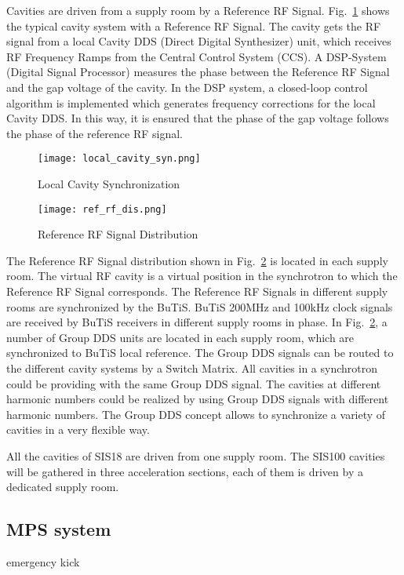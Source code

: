 Cavities are driven from a supply room by a Reference RF Signal. Fig.~\ref{local_cavity_syn} shows the typical cavity system with a Reference RF Signal. The cavity gets the RF signal from a local Cavity DDS (Direct Digital Synthesizer) unit, which receives RF Frequency Ramps from the Central Control System (\gls{CCS}). A \gls{DSP}-System (Digital Signal Processor) measures the phase between the Reference RF Signal and the gap voltage of the cavity. In the DSP system, a closed-loop control algorithm is implemented which generates frequency corrections for the local Cavity DDS. In this way, it is ensured that the phase of the gap voltage follows the phase of the reference RF signal. 
\begin{figure}[!htb]
   \centering   
   \texttt{[image: local\_cavity\_syn.png]}
   \caption{Local Cavity Synchronization}
   \label{local_cavity_syn}
\end{figure}
\begin{figure}[!htb]
   \centering   
   \texttt{[image: ref\_rf\_dis.png]}
   \caption{Reference RF Signal Distribution}
   \label{ref_rf_dis}
\end{figure}
The Reference RF Signal distribution shown in Fig.~\ref{ref_rf_dis} is located in each supply room. The virtual RF cavity is a virtual position in the synchrotron to which the Reference RF Signal corresponds. The Reference RF Signals in different supply rooms are synchronized by the BuTiS. BuTiS 200MHz and 100kHz clock signals are received by BuTiS receivers in different supply rooms in phase. In Fig.~\ref{ref_rf_dis}, a number of Group DDS units are located in each supply room, which are synchronized to BuTiS local reference. The Group DDS signals can be routed to the different cavity systems by a Switch Matrix. All cavities in a synchrotron could be providing with the same Group DDS signal. The cavities at different harmonic numbers could be realized by using Group DDS signals with different harmonic numbers. The Group DDS concept allows to synchronize a variety of cavities in a very flexible way. 

All the cavities of SIS18 are driven from one supply room. The SIS100 cavities will be gathered in three acceleration sections, each of them is driven by a dedicated supply room. 

\subsection{\gls{MPS} system}
emergency kick

